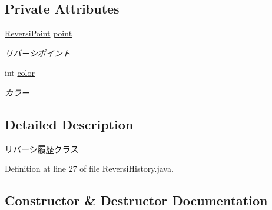 \subsection*{Private Attributes}
\begin{DoxyCompactItemize}
\item 
\mbox{\label{classjp_1_1gr_1_1java__conf_1_1yuta__yoshinaga_1_1reversi_1_1model_1_1_reversi_history_a7f31cdd1562de0a3a73ba2298f030072}} 
\hyperlink{classjp_1_1gr_1_1java__conf_1_1yuta__yoshinaga_1_1reversi_1_1model_1_1_reversi_point}{Reversi\+Point} \hyperlink{classjp_1_1gr_1_1java__conf_1_1yuta__yoshinaga_1_1reversi_1_1model_1_1_reversi_history_a7f31cdd1562de0a3a73ba2298f030072}{point}
\begin{DoxyCompactList}\small\item\em リバーシポイント \end{DoxyCompactList}\item 
\mbox{\label{classjp_1_1gr_1_1java__conf_1_1yuta__yoshinaga_1_1reversi_1_1model_1_1_reversi_history_a309884e0e91f9573f9a63f000380fc23}} 
int \hyperlink{classjp_1_1gr_1_1java__conf_1_1yuta__yoshinaga_1_1reversi_1_1model_1_1_reversi_history_a309884e0e91f9573f9a63f000380fc23}{color}
\begin{DoxyCompactList}\small\item\em カラー \end{DoxyCompactList}\end{DoxyCompactItemize}


\subsection{Detailed Description}
リバーシ履歴クラス 

Definition at line 27 of file Reversi\+History.\+java.



\subsection{Constructor \& Destructor Documentation}
\mbox{\label{classjp_1_1gr_1_1java__conf_1_1yuta__yoshinaga_1_1reversi_1_1model_1_1_reversi_history_abd0f556489e10b58555304449c6c2682}} 
